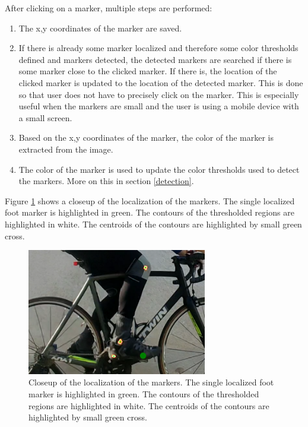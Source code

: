After clicking on a marker, multiple steps are performed:
\begin{enumerate}
    \item The x,y coordinates of the marker are saved.
    \item If there is already some marker localized and therefore some color thresholds defined and markers detected, the detected markers are searched if there is some marker close to the clicked marker. If there is, the location of the clicked marker is updated to the location of the detected marker. This is done so that user does not have to precisely click on the marker. This is especially useful when the markers are small and the user is using a mobile device with a small screen.
    \item Based on the x,y coordinates of the marker, the color of the marker is extracted from the image.
    \item The color of the marker is used to update the color thresholds used to detect the markers. More on this in section \ref{detection}.
\end{enumerate}

Figure \ref{fig:marker_crop} shows a closeup of the localization of the markers. The single localized foot marker is highlighted in green. The contours of the thresholded regions are highlighted in white. The centroids of the contours are highlighted by small green cross.
\begin{figure}[htb]
    \centering
    \includegraphics[width=0.7\textwidth]{obrazky-figures/markers_crop.png}
    \caption{Closeup of the localization of the markers. The single localized foot marker is highlighted in green. The contours of the thresholded regions are highlighted in white. The centroids of the contours are highlighted by small green cross.}
    \label{fig:marker_crop}
\end{figure}

